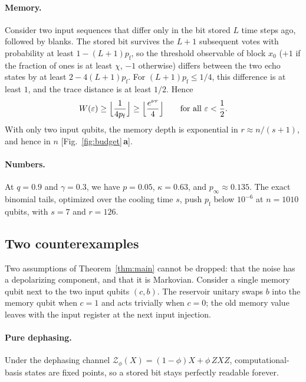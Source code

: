 \documentclass[aps,pra,reprint,superscriptaddress,floatfix]{revtex4-2}
\theoremstyle{plain}
\newcommand{\pnl}[1]{\textsf{\textbf{#1}}}
\begin{document}
\paragraph*{Memory.}
Consider two input sequences that differ only in the bit stored $L$ time steps ago, followed by blanks. The stored bit survives the $L+1$ subsequent votes with probability at least $1-(L+1)p_{\mathrm f}$, so the threshold observable of block $x_0$ ($+1$ if the fraction of ones is at least $\chi$, $-1$ otherwise) differs between the two echo states by at least $2-4(L+1)p_{\mathrm f}$. For $(L+1)p_{\mathrm f}\le1/4$, this difference is at least $1$, and the trace distance is at least $1/2$. Hence
\begin{equation}
W(\varepsilon)\ge\Bigl\lfloor\frac1{4p_{\mathrm f}}\Bigr\rfloor\ge\Bigl\lfloor\frac{e^{\nu r}}4\Bigr\rfloor\qquad\text{for all }\varepsilon<\frac12 .
\end{equation}
With only two input qubits, the memory depth is exponential in $r\approx n/(s+1)$, and hence in $n$ [Fig.~\ref{fig:budget}\,\pnl{a}].

\paragraph*{Numbers.}
At $q=0.9$ and $\gamma=0.3$, we have $p=0.05$, $\kappa=0.63$, and $p_\infty\approx0.135$. The exact binomial tails, optimized over the cooling time $s$, push $p_{\mathrm f}$ below $10^{-6}$ at $n=1010$ qubits, with $s=7$ and $r=126$.

\subsection{Two counterexamples}

Two assumptions of Theorem~\ref{thm:main} cannot be dropped: that the noise has a depolarizing component, and that it is Markovian. Consider a single memory qubit next to the two input qubits $(c,b)$. The reservoir unitary swaps $b$ into the memory qubit when $c=1$ and acts trivially when $c=0$; the old memory value leaves with the input register at the next input injection.

\paragraph*{Pure dephasing.}
Under the dephasing channel $\mathcal Z_\phi(X)=(1-\phi)X+\phi\,ZXZ$, computational-basis states are fixed points, so a stored bit stays perfectly readable forever.
\end{document}

